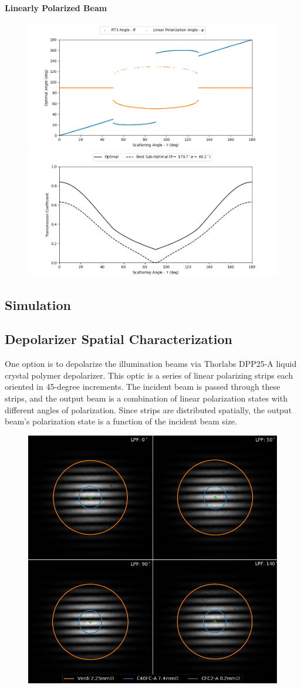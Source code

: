 \paragraph{Linearly Polarized Beam}

\begin{figure}
    \centering
    \includegraphics[width=0.49\linewidth]{figures/polctrl1_traj.png}
    \includegraphics[width=0.49\linewidth]{figures/polctrl1_trans.png}
    \caption{}
    \label{fig:polctrl1}
\end{figure}

\subsection{Simulation}

\subsection{Depolarizer Spatial Characterization}
One option is to depolarize the illumination beams via Thorlabs DPP25-A liquid crystal polymer depolarizer. This optic is a series of linear polarizing strips each oriented in 45-degree increments. The incident beam is passed through these strips, and the output beam is a combination of linear polarization states with different angles of polarization. Since strips are distributed spatially, the output beam's polarization state is a function of the incident beam size.

\begin{figure}
    \centering
    \includegraphics[width=0.5\linewidth]{../figures/depol_spatial.png}
    \caption{}
    \label{fig:depol_spatial}
\end{figure}

